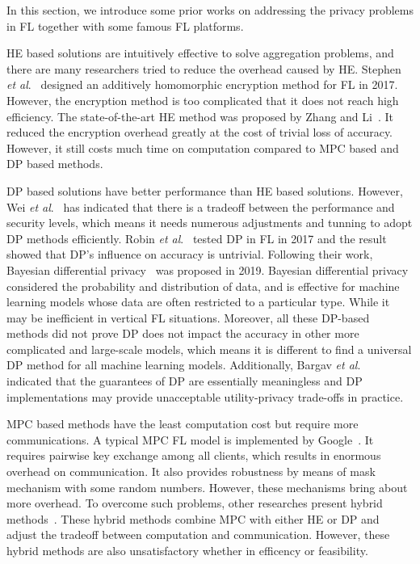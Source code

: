 In this section, we introduce some prior works on addressing the privacy problems in FL together with some famous FL platforms.

HE based solutions are intuitively effective to solve aggregation problems, and there are many researchers tried to reduce the overhead caused by HE. Stephen \emph{et al}.~\cite{abs-1711-10677} designed an additively homomorphic encryption method for FL in 2017. However, the encryption method is too complicated that it does not reach high efficiency. The state-of-the-art HE method was proposed by Zhang and Li~\cite{BatchCrypt}. It reduced the encryption overhead greatly at the cost of trivial loss of accuracy. However, it still costs much time on computation compared to MPC based and DP based methods.

DP based solutions have better performance than HE based solutions. However, Wei \emph{et al}.~\cite{DPAnalysis} has indicated that there is a tradeoff between the performance and security levels, which means it needs numerous adjustments and tunning to adopt DP methods efficiently. Robin \emph{et al}.~\cite{geyer2017differentially} tested DP in FL in 2017 and the result showed that DP's influence on accuracy is untrivial. Following their work, Bayesian differential privacy~\cite{Bayesian} was proposed in 2019. Bayesian differential privacy considered the probability and distribution of data, and is effective for machine learning models whose data are often restricted to a particular type. While it may be inefficient in vertical FL situations. Moreover, all these DP-based methods did not prove DP does not impact the accuracy in other more complicated and large-scale models, which means it is different to find a universal DP method for all machine learning models. Additionally, Bargav \emph{et al}.~\cite{Bargav19} indicated that the guarantees of DP are essentially meaningless and DP implementations may provide unacceptable utility-privacy trade-offs in practice.

MPC based methods have the least computation cost but require more communications. A typical MPC FL model is implemented by Google~\cite{Practical}. It requires pairwise key exchange among all clients, which results in enormous overhead on communication. It also provides robustness by means of mask mechanism with some random numbers. However, these mechanisms bring about more overhead. To overcome such problems, other researches present hybrid methods~\cite{Hybrid,HybridAlpha}. These hybrid methods combine MPC with either HE or DP and adjust the tradeoff between computation and communication. However, these hybrid methods are also unsatisfactory whether in efficency or feasibility.


